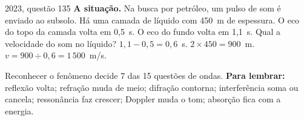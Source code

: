 \begin{enemreal}{2023, questão 135}
\textbf{A situação.} Na busca por petróleo, um pulso de som é enviado ao subsolo. Há uma camada de líquido com 450~m de espessura.
O eco do topo da camada volta em 0,5~s. O eco do fundo volta em 1,1~s. Qual a velocidade do som no líquido?
 $1{,}1 - 0{,}5 = 0{,}6$~s.
 $2 \times 450 = 900$~m.
 $v = 900 \div 0{,}6 = 1\,500$~m/s.
\end{enemreal}


Reconhecer o fenômeno decide 7 das 15 questões de ondas.
{\small\textbf{Para lembrar:} reflexão volta; refração muda de meio; difração contorna; interferência soma ou cancela;
ressonância faz crescer; Doppler muda o tom; absorção fica com a energia.}

